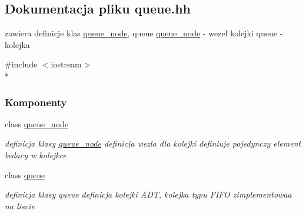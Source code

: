 \hypertarget{queue_8hh}{}\subsection{Dokumentacja pliku queue.\+hh}
\label{queue_8hh}


zawiera definicje klas \hyperlink{classqueue__node}{queue\+\_\+node}, queue \hyperlink{classqueue__node}{queue\+\_\+node} -\/ wezel kolejki queue -\/ kolejka  


{\ttfamily \#include $<$iostream$>$}\\*
\subsubsection*{Komponenty}
\begin{DoxyCompactItemize}
\item 
class \hyperlink{classqueue__node}{queue\+\_\+node}
\begin{DoxyCompactList}\small\item\em definicja klasy \hyperlink{classqueue__node}{queue\+\_\+node} definicja wezla dla kolejki definiuje pojedynczy element bedacy w kolejkce \end{DoxyCompactList}\item 
class \hyperlink{classqueue}{queue}
\begin{DoxyCompactList}\small\item\em definicja klasy queue definicja kolejki A\+D\+T, kolejka typu F\+I\+F\+O zimplementowaa na liscie \end{DoxyCompactList}\end{DoxyCompactItemize}
